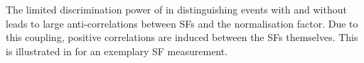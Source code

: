 
The limited discrimination power of \mTW in distinguishing \ttbar events with
and without \faketauhadvis leads to large anti-correlations between
\faketauhadvis SFs and the \ttbar normalisation factor. Due to this coupling,
positive correlations are induced between the SFs themselves. This is
illustrated in  for an exemplary SF measurement.



